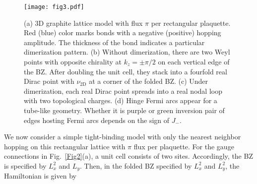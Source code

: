 \documentclass[aps,prl,twocolumn,noshowpacs,superscriptaddress]{revtex4-1}
\def \H {\mathcal{H}}
\def \i {\mathrm{i}}
\def \k {\bm{k}}
\begin{document}
\begin{figure}
	\texttt{[image: fig3.pdf]}
	\caption{(a) 3D graphite lattice model with flux $\pi$ per rectangular plaquette. Red (blue) color marks bonds with a negative (positive) hopping amplitude. The thickness of the bond indicates a particular dimerization pattern. (b) Without dimerization, there are two Weyl points with opposite chirality at $k_z=\pm\pi/2$ on each vertical edge of the BZ. After doubling the unit cell, they stack into a fourfold real Dirac point with $\nu_\text{2D}$ at a corner of the folded BZ. (c) Under dimerization, each real Dirac point spreads into a real nodal loop with two topological charges. (d) Hinge Fermi arcs appear for a tube-like geometry. Whether it is purple or green inversion pair of edges hosting Fermi arcs depends on the sign of $J_{-}$.  \label{Fig3}}
\end{figure}

We now consider a simple tight-binding model with only the nearest neighbor hopping on this rectangular lattice with $\pi$ flux per plaquette. For the gauge connections in Fig.~\ref{Fig2}(a), a unit cell consists of two sites. Accordingly, the BZ is specified by $L_x^2$ and $L_y$. Then, in the folded BZ specified by $L_x^2$ and $L_y^2$, the Hamiltonian is given by
\end{document}
